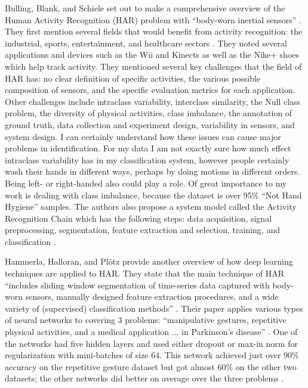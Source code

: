 \documentclass[]{report}
\begin{document}
Bulling, Blank, and Schiele set out to make a comprehensive overview of the Human Activity Recognition (HAR) problem with ``body-worn inertial sensors'' \cite{Bulling}. They first mention several fields that would benefit from activity recognition: the industrial, sports, entertainment, and healthcare sectors \cite{Bulling}. They noted several applications and devices such as the Wii and Kinects as well as the Nike+ shoes which help track activity. They mentioned several key challenges that the field of HAR has: no clear definition of specific activities, the various possible composition of sensors, and the specific evaluation metrics for each application. Other challenges include intraclass variability, interclass similarity, the Null class problem, the diversity of physical activities, class imbalance, the annotation of ground truth, data collection and experiment design, variability in sensors, and system design. I can certainly understand how these issues can cause major problems in identification. For my data I am not exactly sure how much effect intraclass variability has in my classification system, however people certainly wash their hands in different ways, perhaps by doing motions in different orders. Being left- or right-handed also could play a role. Of great importance to my work is dealing with class imbalance, because the dataset is over 95\% ``Not Hand Hygiene'' samples. The authors also propose a system model called the Activity Recognition Chain which has the following steps: data acquisition, signal preprocessing, segmentation, feature extraction and selection, training, and classification \cite{Bulling}. 

Hammerla, Halloran, and Plötz provide another overview of how deep learning techniques are applied to HAR. They state that the main technique of HAR ``includes sliding window segmentation of time-series data captured with body-worn sensors, manually designed feature extraction procedures, and a wide variety of (supervised) classification methods'' \cite{Hammerla}. Their paper applies various types of neural networks to covering 3 problems: ``manipulative gestures, repetitive physical activities, and a medical application ... in Parkinson's disease'' \cite{Hammerla}. One of the networks had five hidden layers and used either dropout or max-in norm for regularization with mini-batches of size 64. This network achieved just over 90\% accuracy on the repetitive gesture dataset but got almost 60\% on the other two datasets; the other networks did better on average over the three problems \cite{Hammerla}.
\end{document}
